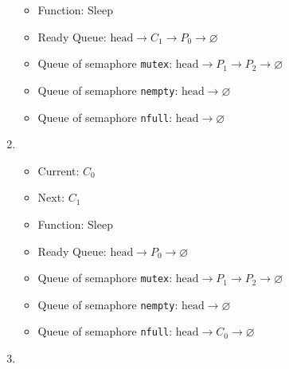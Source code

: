 \documentclass[11pt]{article}
\begin{document}
\begin{question}
\begin{enumerate}
{\begin{itemize}
                    \item{Function: Sleep}
                    \item{
                        Ready Queue: $\text{head}\longrightarrow
                        C_{1}\longrightarrow
                        P_{0}\longrightarrow\varnothing$
                    } \item{
                        Queue of semaphore {\tt mutex}: $\text{head}\longrightarrow
                        P_{1}\longrightarrow
                        P_{2}\longrightarrow
                        \varnothing$
                    }
                    \item{
                        Queue of semaphore {\tt nempty}: $\text{head}\longrightarrow\varnothing$
                    }
                    \item{
                        Queue of semaphore {\tt nfull}: $\text{head}\longrightarrow\varnothing$
                    }
                \end{itemize}
            }
            \item {
                \begin{itemize}
                    \item{Current: $C_{0}$}
                    \item{Next: $C_{1}$}
                    \item{Function: Sleep}
                    \item{
                        Ready Queue: $\text{head}\longrightarrow
                        P_{0}\longrightarrow\varnothing$
                    } \item{
                        Queue of semaphore {\tt mutex}: $\text{head}\longrightarrow
                        P_{1}\longrightarrow
                        P_{2}\longrightarrow
                        \varnothing$
                    }
                    \item{
                        Queue of semaphore {\tt nempty}: $\text{head}\longrightarrow\varnothing$
                    }
                    \item{
                        Queue of semaphore {\tt nfull}: $\text{head}\longrightarrow
                        C_{0}\longrightarrow
                        \varnothing$
                    }
                \end{itemize}
                }
                \item {
                    \begin{itemize}

\end{itemize}}
\end{enumerate}
\end{question}
\end{document}
